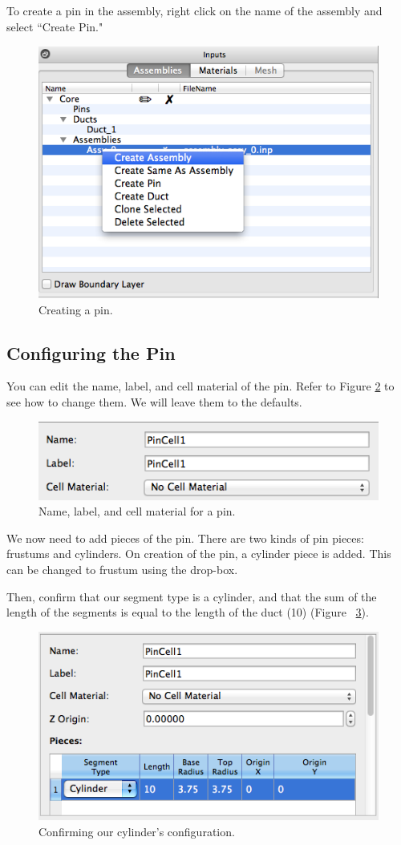 To create a pin in the assembly, right click on the name of the assembly and select ``Create Pin."

\begin{figure}[H]
	\begin{center}
		\includegraphics[width=0.5\linewidth]{Images/hex-create-pin.png}
		\caption{Creating a pin.}
		\label{fig:Hex9}
	\end{center}
\end{figure}

\subsection{Configuring the Pin}

You can edit the name, label, and cell material of the pin.  Refer to Figure \ref{fig:Hex10} to see how to change them.  We will leave them to the defaults.

\begin{figure}[H]
	\begin{center}
		\includegraphics[width=0.5\linewidth]{Images/hex-default-pin-params.png}
		\caption{Name, label, and cell material for a pin.}
		\label{fig:Hex10}
	\end{center}
\end{figure}

We now need to add pieces of the pin.  There are two kinds of pin pieces: frustums and cylinders.  On creation of the pin, a cylinder piece is added.  This can be changed to frustum using the drop-box.

Then, confirm that our segment type is a cylinder, and that the sum of the length of the segments is equal to the length of the duct (10) (Figure ~\ref{fig:Hex12}).

\begin{figure}[H]
	\begin{center}
		\includegraphics[width=0.5\linewidth]{Images/hex-pin-configure.png}
		\caption{Confirming our cylinder's configuration.}
		\label{fig:Hex12}
	\end{center}
\end{figure}

